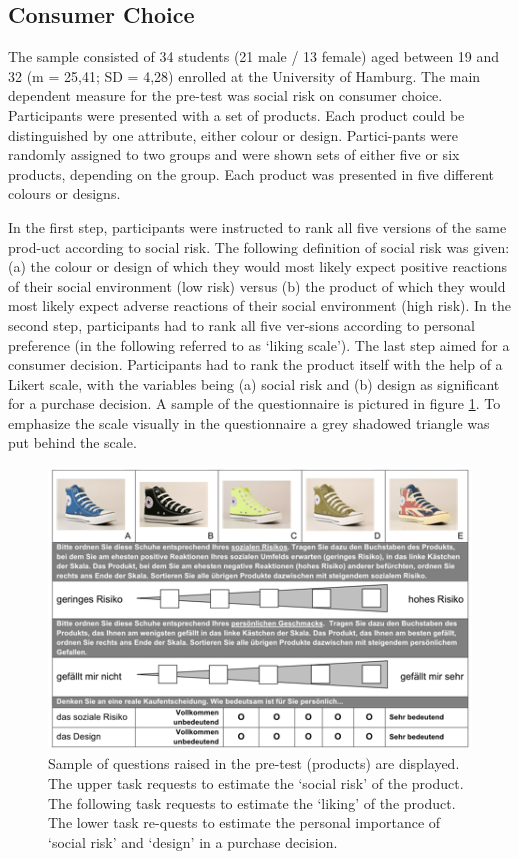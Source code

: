 \subsection{Consumer Choice}
The sample consisted of 34 students (21 male / 13 female) aged between 19 and 32 (m = 25,41; SD = 4,28) enrolled at the University of Hamburg. The main dependent measure for the pre-test was social risk on consumer choice. Participants were presented with a set of products. Each product could be distinguished by one attribute, either colour or design. Partici-pants were randomly assigned to two groups and were shown sets of either five or six products, depending on the group. Each product was presented in five different colours or designs. \par
In the first step, participants were instructed to rank all five versions of the same prod-uct according to social risk. The following definition of social risk was given: (a) the colour or design of which they would most likely expect positive reactions of their social environment (low risk) versus (b) the product of which they would most likely expect adverse reactions of their social environment (high risk). In the second step, participants had to rank all five ver-sions according to personal preference (in the following referred to as ‘liking scale’). The last step aimed for a consumer decision. Participants had to rank the product itself with the help of a Likert scale, with the variables being (a) social risk and (b) design as significant for a purchase decision. A sample of the questionnaire is pictured in figure \ref{fig:pretest_sample_shoes}. To emphasize the scale visually in the questionnaire a grey shadowed triangle was put behind the scale.\par
\begin{figure}[h!]
\center
	\includegraphics[width=1\textwidth]{images/pretest_sample_shoes.png}
  \caption{Sample of questions raised in the pre-test (products) are displayed. The upper task requests to estimate the ‘social risk’ of the product. The following task requests to estimate the ‘liking’ of the product. The lower task re-quests to estimate the personal importance of ‘social risk’ and ‘design’ in a purchase decision.}\label{fig:pretest_sample_shoes}
\end{figure}
